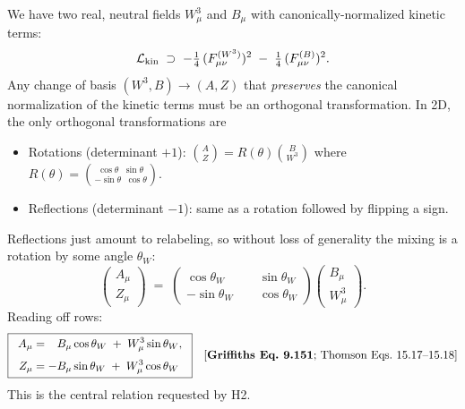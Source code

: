 \documentclass[11pt]{article}
\begin{document}
\begin{stepbox}[title=Step 3.3: Write down the most general allowed mixing]
We have two real, neutral fields $W^3_\mu$ and $B_\mu$ with canonically-normalized kinetic
terms:
\[
\mathcal{L}_{\rm kin} \;\supset\; -\tfrac{1}{4}\,(F^{(W^3)}_{\mu\nu})^2 \;-\; \tfrac{1}{4}\,(F^{(B)}_{\mu\nu})^2 .
\]
Any change of basis $(W^3, B) \to (A, Z)$ that \emph{preserves} the canonical normalization
of the kinetic terms must be an orthogonal transformation. In 2D, the only orthogonal
transformations are
\begin{itemize}[leftmargin=*]
  \item Rotations (determinant $+1$): $\binom{A}{Z} = R(\theta) \binom{B}{W^3}$ where $R(\theta) = \binom{\cos\theta\;\;\sin\theta}{-\sin\theta\;\;\cos\theta}$.
  \item Reflections (determinant $-1$): same as a rotation followed by flipping a sign.
\end{itemize}
Reflections just amount to relabeling, so without loss of generality the mixing is a
rotation by some angle $\theta_W$:
\[
\begin{pmatrix} A_\mu \\ Z_\mu \end{pmatrix}
\;=\;
\begin{pmatrix} \cos\theta_W & \phantom{-}\sin\theta_W \\[2pt] -\sin\theta_W & \phantom{-}\cos\theta_W \end{pmatrix}
\begin{pmatrix} B_\mu \\ W^3_\mu \end{pmatrix}.
\]
Reading off rows:
\[
\boxed{\;\;
\begin{aligned}
A_\mu &= \phantom{-}B_\mu \cos\theta_W \;+\; W^3_\mu \sin\theta_W, \\[3pt]
Z_\mu &= -B_\mu \sin\theta_W \;+\; W^3_\mu \cos\theta_W
\end{aligned}
\;\;}
\quad\text{[\textbf{Griffiths Eq.~9.151}; Thomson Eqs.~15.17--15.18]}
\]
This is the central relation requested by H2.
\end{stepbox}
\end{document}
